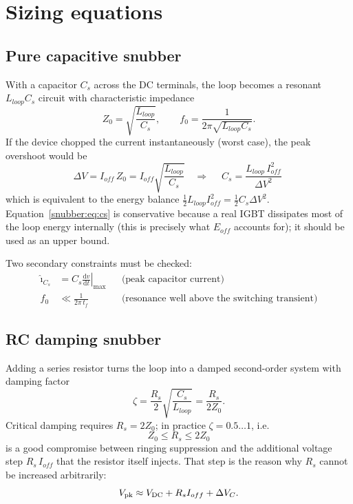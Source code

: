 \section{Sizing equations}

\subsection{Pure capacitive snubber}

With a capacitor $C_s$ across the DC terminals, the loop becomes a resonant
$L_{loop}C_s$ circuit with characteristic impedance
\begin{equation}
Z_0 = \sqrt{\frac{L_{loop}}{C_s}}, \qquad
f_0 = \frac{1}{2\pi\sqrt{L_{loop}C_s}}.
\end{equation}
If the device chopped the current instantaneously (worst case), the peak
overshoot would be
\begin{equation}
\Delta V = I_{off}\,Z_0 = I_{off}\sqrt{\frac{L_{loop}}{C_s}}
\quad\Longrightarrow\quad
\boxed{\;C_s = \frac{L_{loop}\,I_{off}^{2}}{\Delta V^{2}}\;}
\label{snubber:eq:cs}
\end{equation}
which is equivalent to the energy balance
$\tfrac{1}{2}L_{loop}I_{off}^{2} = \tfrac{1}{2}C_s\Delta V^{2}$.
Equation~\eqref{snubber:eq:cs} is conservative because a real IGBT dissipates most of
the loop energy internally (this is precisely what $E_{off}$ accounts for);
it should be used as an upper bound.

Two secondary constraints must be checked:
\begin{align}
\hat\imath_{C_s} &= C_s \left.\frac{\mathrm{d}v}{\mathrm{d}t}\right|_{\max}
  && \text{(peak capacitor current)} \label{snubber:eq:icap}\\
f_0 &\ll \frac{1}{2\pi\,t_f}
  && \text{(resonance well above the switching transient)} \nonumber
\end{align}

\subsection{RC damping snubber}

Adding a series resistor turns the loop into a damped second-order system with
damping factor
\begin{equation}
\zeta = \frac{R_s}{2}\sqrt{\frac{C_s}{L_{loop}}} = \frac{R_s}{2 Z_0}.
\end{equation}
Critical damping requires $R_s = 2Z_0$; in practice
$\zeta = 0.5\ldots 1$, i.e.
\begin{equation}
\boxed{\;Z_0 \le R_s \le 2 Z_0\;}
\end{equation}
is a good compromise between ringing suppression and the additional voltage
step $R_s\,I_{off}$ that the resistor itself injects. That step is the reason
why $R_s$ cannot be increased arbitrarily:
\begin{equation}
V_{\mathrm{pk}} \approx V_{\mathrm{DC}} + R_s I_{off} + \Delta V_{C}.
\end{equation}

